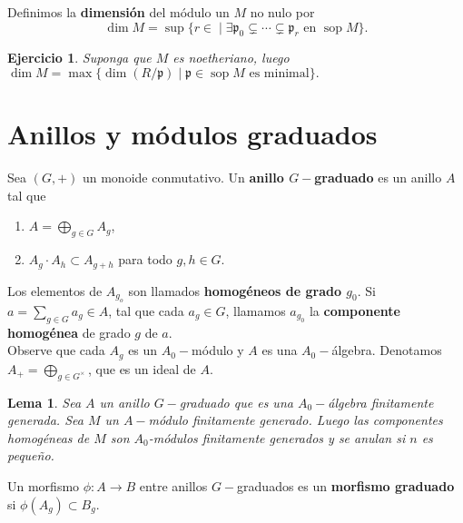 \documentclass[12pt]{book}
\newtheorem{teo}{Teorema}
\newtheorem{lem}{Lema}
\newtheorem{ex}{Ejercicio}
\newcommand{\pp}{\mathfrak{p}}
\newcommand{\sop}{\operatorname{sop}}
\begin{document}

Definimos la \textbf{dimensión} del módulo un $M$ no nulo por $$\dim M = \sup \{ r\in \;|\;  \exists \pp_0 \subsetneq \cdots \subsetneq \pp _r \mbox{ en }  \sop M\} .$$
\begin{ex}
Suponga que $M$ es noetheriano, luego $\dim M= \max\{  \dim (R/\pp ) \; | \;  \pp \in \sop M \mbox{ es minimal} \}.$
\end{ex}








\section{Anillos y módulos graduados}

Sea $(G,+)$ un monoide conmutativo. Un \textbf{anillo $G-$graduado} es un anillo $A$ tal que 
\begin{enumerate}
	\item $A= \bigoplus _{g\in G} A_g $,
	\item $A_g \cdot A_h \subset A_{g+h} $ para todo $g,h \in G$.
\end{enumerate}
Los elementos de $A_{g_o}$ son llamados \textbf{homogéneos de grado $g_0$}. Si $a= \sum _{g \in G} a_g \in A$, tal que cada $a_g\in G$, llamamos $a_{g_0}$ la \textbf{componente homogénea} de grado $g$ de $a$.\\
Observe que cada $A_g$ es un $A_0-$módulo y $A$ es una $A_0-$álgebra. Denotamos $A_+ = \bigoplus_{g\in G^\times}$, que es un ideal de $A$.



\begin{lem}
	Sea $A$ un anillo $G-$graduado que es una $A_0-$álgebra finitamente generada. Sea $M$ un $A-$módulo finitamente generado. Luego las componentes homogéneas de $M$ son $A_0$-módulos finitamente generados y se anulan si $n$ es pequeño. 
\end{lem}

Un morfismo $\phi: A\rightarrow B$ entre anillos $G-$graduados es un \textbf{morfismo graduado} si $\phi (A_g) \subset B_g$.\\
\end{document}
